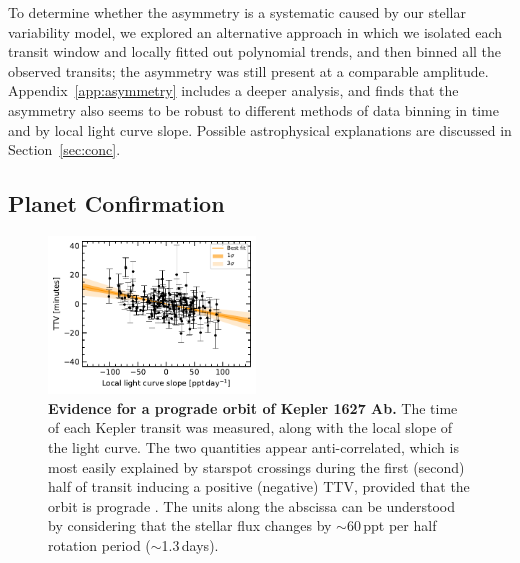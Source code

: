 \documentclass[12pt,modern,twocolumn,tighten]{aastex63}
\begin{document}
To determine whether the asymmetry is a systematic caused by our
stellar variability model, we explored an alternative approach in
which we isolated each transit window and locally fitted out
polynomial trends, and then binned all the observed transits; the
asymmetry was still present at a comparable amplitude.
Appendix~\ref{app:asymmetry} includes a deeper analysis, and finds
that the asymmetry also seems to be robust to different methods of
data binning in time and by local light curve slope.  Possible
astrophysical explanations are discussed in Section~\ref{sec:conc}.


\subsection{Planet Confirmation}

\begin{figure}[tp]
	\begin{center}
		\leavevmode
		\includegraphics[width=0.49\textwidth]{f6.pdf}
	\end{center}
	\vspace{-0.6cm}
	\caption{
    {\bf Evidence for a prograde orbit of Kepler 1627 Ab.} The time of
    each Kepler transit was measured, along with the local slope of
    the light curve.  The two quantities appear anti-correlated, which
    is most easily explained by starspot crossings during the first
    (second) half of transit inducing a positive (negative) TTV,
    provided that the orbit is prograde \citep{mazeh_time_2015}.  The
    units along the abscissa can be understood by considering that the
    stellar flux changes by $\sim$60\,ppt per half rotation period
    ($\sim$1.3\,days).
		\label{fig:corr}
	}
\end{figure}
\end{document}
